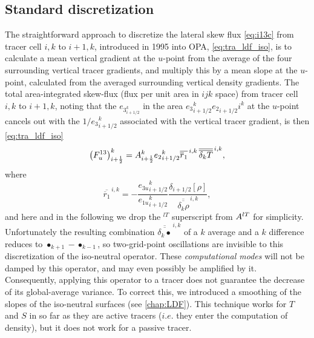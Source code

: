 \documentclass[../tex_main/NEMO_manual]{subfiles}
\begin{document}
\subsection{Standard discretization}
The straightforward approach to discretize the lateral skew flux
\autoref{eq:i13c} from tracer cell $i,k$ to $i+1,k$, introduced in 1995
into OPA, \autoref{eq:tra_ldf_iso}, is to calculate a mean vertical
gradient at the $u$-point from the average of the four surrounding
vertical tracer gradients, and multiply this by a mean slope at the
$u$-point, calculated from the averaged surrounding vertical density
gradients. The total area-integrated skew-flux (flux per unit area in
$ijk$ space) from tracer cell $i,k$
to $i+1,k$, noting that the $e_{{3}_{i+1/2}^k}$ in the area
$e{_{3}}_{i+1/2}^k{e_{2}}_{i+1/2}i^k$ at the $u$-point cancels out with
the $1/{e_{3}}_{i+1/2}^k$ associated with the vertical tracer
gradient, is then \autoref{eq:tra_ldf_iso}
\begin{equation*}
  \left(F_u^{13} \right)_{i+\scriptstyle\frac{1}{2}}^k = {A}_{i+\scriptstyle\frac{1}{2}}^k
  {e_{2}}_{i+1/2}^k \overline{\overline
    r_1} ^{\,i,k}\,\overline{\overline{\delta_k T}}^{\,i,k},
\end{equation*}
where
\begin{equation*}
  \overline{\overline
   r_1} ^{\,i,k} = -\frac{{e_{3u}}_{i+1/2}^k}{{e_{1u}}_{i+1/2}^k}
  \frac{\delta_{i+1/2} [\rho]}{\overline{\overline{\delta_k \rho}}^{\,i,k}},
\end{equation*}
and here and in the following we drop the $^{lT}$ superscript from
${A^{lT}}$ for simplicity.
Unfortunately the resulting combination $\overline{\overline{\delta_k
    \bullet}}^{\,i,k}$ of a $k$ average and a $k$ difference %
reduces to $\bullet_{k+1}-\bullet_{k-1}$, so two-grid-point oscillations are
invisible to this discretization of the iso-neutral operator. These
\emph{computational modes} will not be damped by this operator, and
may even possibly be amplified by it.  Consequently, applying this
operator to a tracer does not guarantee the decrease of its
global-average variance. To correct this, we introduced a smoothing of
the slopes of the iso-neutral surfaces (see \autoref{chap:LDF}). This
technique works for $T$ and $S$ in so far as they are active tracers
($i.e.$ they enter the computation of density), but it does not work
for a passive tracer.
\end{document}

